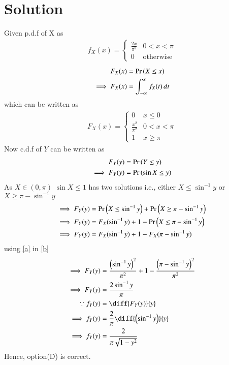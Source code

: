 \documentclass[journal,12pt,twocolumn]{IEEEtran}
\begin{document}
\section*{Solution}
Given p.d.f of X as
\begin{align}
    f_{X}(x)=\begin{cases} 
            \frac{2x}{\pi^2}  &  0<x<\pi\\
            0 & \text{otherwise}
            \end{cases} 
\end{align}
\begin{align}
    F_X(x) &= \Pr\left(X\leq x\right)\\
    \implies F_X(x) &= \int_{-\infty}^{x}f_X(t)\,dt
\end{align}
which can be written as
\begin{align}
    F_{X}(x)=\begin{cases} 
            0 & x\le 0\\
            \frac{x^2}{\pi^2}  &  0<x<\pi\\
            1 & x\ge \pi
            \end{cases}
            \label{a}
\end{align}
Now c.d.f of $Y$ can be written as 
\begin{align}
    F_Y(y) &= \Pr\left(Y\leq y\right)\\
    \implies F_Y(y) &= \Pr\left(\sin{X}\leq y\right)
\end{align}
As $X\in(0,\pi)$ $\sin{X}\leq 1$ has two solutions i.e., either
 $X\leq \sin^{-1}{y}$ or $X\geq \pi-\sin^{-1}{y}$
\begin{align}
    \implies F_Y(y) &= \Pr\left(X\leq \sin^{-1}{y}\right)+\Pr\left(X\geq \pi-\sin^{-1}{y}\right)\\
    \implies F_Y(y) &= F_X(\sin^{-1}{y})+1-\Pr\left(X\leq \pi-\sin^{-1}{y}\right)\\
    \implies F_Y(y) &= F_X(\sin^{-1}{y})+1-F_X(\pi-\sin^{-1}{y})
    \label{b}
\end{align}
using \eqref{a} in \eqref{b}
\begin{align}
    \implies F_Y(y) &= \frac{\brak{\sin^{-1}{y}}^2}{\pi^2}+1-\frac{\brak{\pi-\sin^{-1}{y}}^2}{\pi^2}\\
    \implies F_Y(y) &= \frac{2\sin^{-1}{y}}{\pi}\\
    \because f_Y(y) &= \diff{F_Y(y)}{y}\\
    \implies f_Y(y) &= \frac{2}{\pi}\diff{\brak{\sin^{-1}{y}}}{y}\\
    \implies f_Y(y) &= \frac{2}{\pi\sqrt{1-y^2}}
\end{align}
Hence, option(D) is correct.
\end{document}
